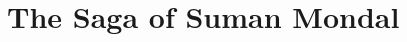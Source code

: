\documentclass{article}
\begin{document}

\newpage
{}
\tableofcontents
\newpage
{}
\setcounter{page}{1}

\section{The Saga of Suman Mondal}
\end{document}
